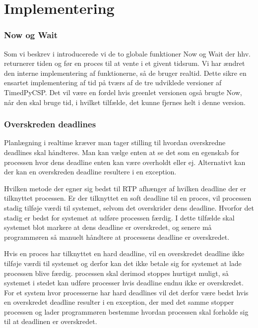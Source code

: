 \section{Implementering}

\subsubsection{Now og Wait}
Som vi beskrev i \des introducerede vi de to globale funktioner Now og Wait der hhv. returnerer tiden og før en proces til at vente i et givent tidsrum. Vi har ændret den interne implementering af funktionerne, så de bruger realtid. Dette sikre en ensartet implementering af tid på tværs af de tre udviklede versioner af TimedPyCSP. Det vil være en fordel hvis greenlet versionen også brugte Now, når den skal bruge tid, i hvilket tilfælde, det kunne fjernes helt i denne version. 

\subsubsection{Overskreden deadlines}
Planlægning i realtime kræver man tager stilling til  hvordan  overskredne deadlines skal håndteres. Man kan vælge enten at se det som en egenskab for processen hvor dens deadline enten kan være overholdt eller ej. Alternativt kan der kan en overskreden deadline resultere i en exception.

Hvilken metode der egner sig bedst til RTP afhænger af hvilken deadline der er tilknyttet processen. Er der tilknyttet en soft deadline til en proces, vil processen stadig tilføje værdi til systemet, selvom det  overskrider dens deadline. Hvorfor  det stadig er bedst for systemet at udføre processen færdig. I dette tilfælde  skal systemet blot markere at dens deadline er overskredet, og senere må programmøren så manuelt håndtere at processens deadline er overskredet. 


Hvis en proces har tilknyttet  en hard deadline, vil en overskredet deadline  ikke tilføje værdi til systemet og derfor kan det ikke betale sig for systemet at lade processen blive færdig. processen skal derimod stoppes hurtigst muligt, så systemet i stedet kan udføre processer hvis deadline endnu ikke er overskredet. For et system hvor processerne har hard deadlines vil det derfor være bedst hvis en overskredet deadline resulter i en exception, der med det samme stopper processen og lader programmøren bestemme hvordan processen skal forholde sig til at deadlinen er overskredet.

